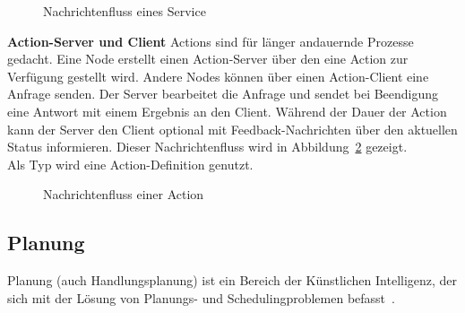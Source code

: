 \begin{figure}[ht!]
    \centering
    \caption{Nachrichtenfluss eines Service}
    \label{fig:service}
\end{figure}
\textbf{Action-Server und Client} Actions sind für länger andauernde Prozesse gedacht.
Eine Node erstellt einen Action-Server über den eine Action zur Verfügung gestellt wird.
Andere Nodes können über einen Action-Client eine Anfrage senden.
Der Server bearbeitet die Anfrage und sendet bei Beendigung eine Antwort mit einem Ergebnis an den Client.
Während der Dauer der Action kann der Server den Client optional mit Feedback-Nachrichten über den aktuellen Status informieren.
Dieser Nachrichtenfluss wird in Abbildung~\ref{fig:action} gezeigt.\\
Als Typ wird eine Action-Definition genutzt.\\
\begin{figure}[ht!]
    \centering
    \caption{Nachrichtenfluss einer Action}
    \label{fig:action}
\end{figure}
\subsection {Planung}{\label{sec:planning}}
Planung (auch Handlungsplanung) ist ein Bereich der Künstlichen Intelligenz, der sich mit der Lösung von Planungs- und Schedulingproblemen befasst~\cite{aiplanning}.

